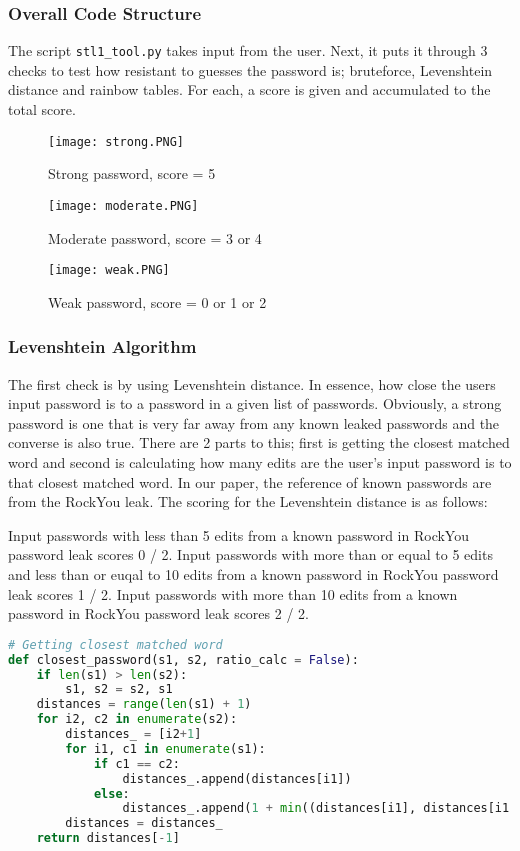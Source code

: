 \documentclass[letterpaper,twocolumn,10pt]{article}
\begin{document}
\subsubsection{Overall Code Structure}
The script \lstinline{stl1_tool.py} takes input from the user. Next, it puts it through 3 checks to test how resistant to guesses the password is; bruteforce, Levenshtein distance and rainbow tables. For each, a score is given and accumulated to the total score. 

\begin{figure}[H]
    \centering
    \texttt{[image: strong.PNG]}
    \caption{Strong password, score = 5}
\end{figure}

\begin{figure}[H]
    \centering
    \texttt{[image: moderate.PNG]}
    \caption{Moderate password, score = 3 or 4}
\end{figure}

\begin{figure}[H]
    \centering
    \texttt{[image: weak.PNG]}
    \caption{Weak password, score = 0 or 1 or 2}
\end{figure}

\subsubsection{Levenshtein Algorithm}
The first check is by using Levenshtein distance\cite{lev}. In essence, how close the users input password is to a password in a given list of passwords. Obviously, a strong password is one that is very far away from any known leaked passwords and the converse is also true. There are 2 parts to this; first is getting the closest matched word and second is calculating how many edits are the user's input password is to that closest matched word. In our paper, the reference of known passwords are from the RockYou leak. The scoring for the Levenshtein distance is as follows: 

Input passwords with less than 5 edits from a known password in RockYou password leak scores 0 / 2. Input passwords with more than or equal to 5 edits and less than or euqal to 10 edits from a known password in RockYou password leak scores 1 / 2. Input passwords with more than 10 edits from a known password in RockYou password leak scores 2 / 2. 


\begin{lstlisting}[language=python, frame=none]
# Getting closest matched word
def closest_password(s1, s2, ratio_calc = False):
    if len(s1) > len(s2):
        s1, s2 = s2, s1
    distances = range(len(s1) + 1)
    for i2, c2 in enumerate(s2):
        distances_ = [i2+1]
        for i1, c1 in enumerate(s1):
            if c1 == c2:
                distances_.append(distances[i1])
            else:
                distances_.append(1 + min((distances[i1], distances[i1 + 1], distances_[-1])))
        distances = distances_
    return distances[-1]
\end{lstlisting}
\end{document}
